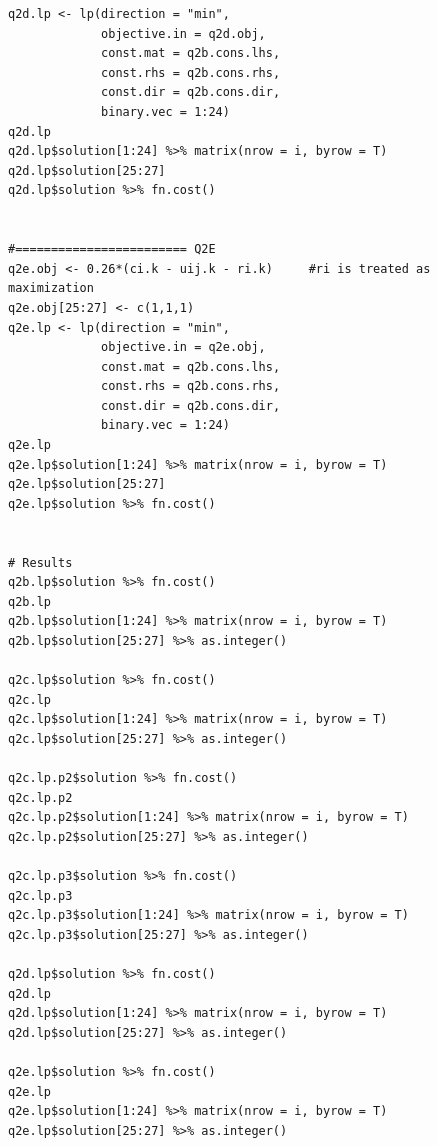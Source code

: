 \documentclass[a4paper,11pt]{article}
\begin{document}
\begin{verbatim}
q2d.lp <- lp(direction = "min",
             objective.in = q2d.obj, 
             const.mat = q2b.cons.lhs, 
             const.rhs = q2b.cons.rhs, 
             const.dir = q2b.cons.dir, 
             binary.vec = 1:24)
q2d.lp
q2d.lp$solution[1:24] %>% matrix(nrow = i, byrow = T)
q2d.lp$solution[25:27]
q2d.lp$solution %>% fn.cost()


#======================== Q2E
q2e.obj <- 0.26*(ci.k - uij.k - ri.k)     #ri is treated as maximization
q2e.obj[25:27] <- c(1,1,1) 
q2e.lp <- lp(direction = "min",
             objective.in = q2e.obj, 
             const.mat = q2b.cons.lhs, 
             const.rhs = q2b.cons.rhs, 
             const.dir = q2b.cons.dir, 
             binary.vec = 1:24)
q2e.lp
q2e.lp$solution[1:24] %>% matrix(nrow = i, byrow = T)
q2e.lp$solution[25:27]
q2e.lp$solution %>% fn.cost()


# Results
q2b.lp$solution %>% fn.cost()
q2b.lp
q2b.lp$solution[1:24] %>% matrix(nrow = i, byrow = T)
q2b.lp$solution[25:27] %>% as.integer()

q2c.lp$solution %>% fn.cost()
q2c.lp
q2c.lp$solution[1:24] %>% matrix(nrow = i, byrow = T)
q2c.lp$solution[25:27] %>% as.integer()

q2c.lp.p2$solution %>% fn.cost()
q2c.lp.p2
q2c.lp.p2$solution[1:24] %>% matrix(nrow = i, byrow = T)
q2c.lp.p2$solution[25:27] %>% as.integer()

q2c.lp.p3$solution %>% fn.cost()
q2c.lp.p3
q2c.lp.p3$solution[1:24] %>% matrix(nrow = i, byrow = T)
q2c.lp.p3$solution[25:27] %>% as.integer()

q2d.lp$solution %>% fn.cost()
q2d.lp
q2d.lp$solution[1:24] %>% matrix(nrow = i, byrow = T)
q2d.lp$solution[25:27] %>% as.integer()

q2e.lp$solution %>% fn.cost()
q2e.lp
q2e.lp$solution[1:24] %>% matrix(nrow = i, byrow = T)
q2e.lp$solution[25:27] %>% as.integer()

\end{verbatim}
\end{document}
